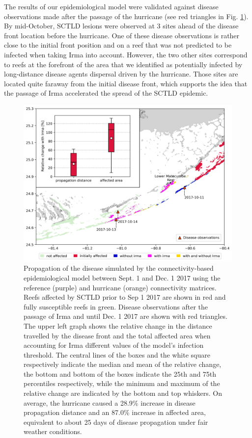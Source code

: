 \documentclass[fleqn,10pt]{wlscirep}
\begin{document}
The results of our epidemiological model were validated against disease observations made after the passage of the hurricane (see red triangles in Fig. \ref{fig:propagation}). By mid-October, SCTLD lesions were observed at 3 sites ahead of the disease front location before the hurricane. One of these disease observations is rather close to the initial front position and on a reef that was not predicted to be infected when taking Irma into account. However, the two other sites correspond to reefs at the forefront of the area that we identified as potentially infected by long-distance disease agents dispersal driven by the hurricane. Those sites are located quite faraway from the initial disease front, which supports the idea that the passage of Irma accelerated the spread of the SCTLD epidemic.

\begin{figure}[tbp]
    \centering
    \includegraphics[width=.8\textwidth]{figures/propagation_boxplot_obs.png}
    \caption{
        Propagation of the disease simulated by the connectivity-based epidemiological model between Sept. 1 and Dec. 1 2017 using the reference (purple) and hurricane (orange) connectivity matrices. Reefs affected by SCTLD prior to Sep 1 2017 are shown in red and fully susceptible reefs in green. Disease observations after the passage of Irma and until Dec. 1 2017 are shown with red triangles. The upper left graph shows the relative change in the distance travelled by the disease front and the total affected area when accounting for Irma different values of the model's infection threshold. The central lines of the boxes and the white square respectively indicate the median and mean of the relative change, the bottom and bottom of the boxes indicate the 25th and 75th percentiles respectively, while the minimum and maximum of the relative change are indicated by the bottom and top whiskers. On average, the hurricane caused  a 28.9\% increase in disease propagation distance and an 87.0\% increase in affected area, equivalent to about 25 days of disease propagation under fair weather conditions.
    }\label{fig:propagation}
\end{figure}
\end{document}
